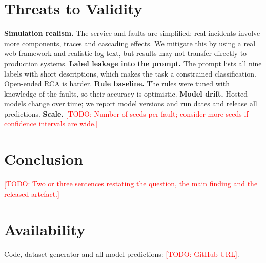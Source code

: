 \documentclass[conference]{IEEEtran}
\newcommand{\TODO}[1]{\textcolor{red}{[TODO: #1]}}
\begin{document}
\section{Threats to Validity}
\textbf{Simulation realism.} The service and faults are simplified; real incidents involve more components, traces and cascading effects. We mitigate this by using a real web framework and realistic log text, but results may not transfer directly to production systems.
\textbf{Label leakage into the prompt.} The prompt lists all nine labels with short descriptions, which makes the task a constrained classification. Open-ended RCA is harder.
\textbf{Rule baseline.} The rules were tuned with knowledge of the faults, so their accuracy is optimistic.
\textbf{Model drift.} Hosted models change over time; we report model versions and run dates and release all predictions.
\textbf{Scale.} \TODO{Number of seeds per fault; consider more seeds if confidence intervals are wide.}

\section{Conclusion}
\TODO{Two or three sentences restating the question, the main finding and the released artefact.}

\section*{Availability}
Code, dataset generator and all model predictions: \TODO{GitHub URL}.

% 
% 
\end{document}
